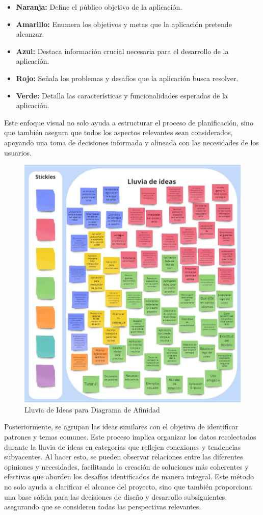 \begin{itemize}
    \item \textbf{Naranja:} Define el público objetivo de la aplicación.
    \item \textbf{Amarillo:} Enumera los objetivos y metas que la aplicación pretende alcanzar.
    \item \textbf{Azul:} Destaca información crucial necesaria para el desarrollo de la aplicación.
    \item \textbf{Rojo:} Señala los problemas y desafíos que la aplicación busca resolver.
    \item \textbf{Verde:} Detalla las características y funcionalidades esperadas de la aplicación.
\end{itemize}

Este enfoque visual no solo ayuda a estructurar el proceso de planificación, sino que también asegura que todos los aspectos relevantes sean considerados, apoyando una toma de decisiones informada y alineada con las necesidades de los usuarios.

\begin{figure} [H]
    \centering
    \includegraphics[width=0.75\linewidth]{figuras/lluevia_diagrama_afinidad.png}
    \caption{Lluvia de Ideas para Diagrama de Afinidad}
    \label{fig:enter-label}
\end{figure}

Posteriormente, se agrupan las ideas similares con el objetivo de identificar patrones y temas comunes. Este proceso implica organizar los datos recolectados durante la lluvia de ideas en categorías que reflejen conexiones y tendencias subyacentes. Al hacer esto, se pueden observar relaciones entre las diferentes opiniones y necesidades, facilitando la creación de soluciones más coherentes y efectivas que aborden los desafíos identificados de manera integral. Este método no solo ayuda a clarificar el alcance del proyecto, sino que también proporciona una base sólida para las decisiones de diseño y desarrollo subsiguientes, asegurando que se consideren todas las perspectivas relevantes.


